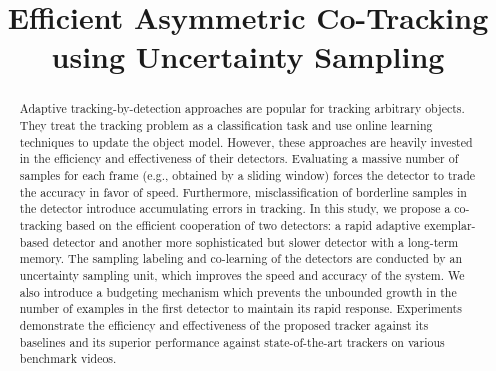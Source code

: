 \documentclass[conference,twoside]{IEEEtran}
\begin{document}
%
\title{Efficient Asymmetric Co-Tracking using Uncertainty Sampling}

\author{
}

\maketitle
\renewcommand{\headrulewidth}{0pt}
\renewcommand{\footrulewidth}{0pt}
\thispagestyle{fancy}
\cfoot{}

\begin{abstract}
Adaptive tracking-by-detection approaches are popular for tracking arbitrary objects. They treat the tracking problem as a classification task and use online learning techniques to update the object model. However, these approaches are heavily invested in the efficiency and effectiveness of their detectors. Evaluating a massive number of samples for each frame (e.g., obtained by a sliding window) forces the detector to trade the accuracy in favor of speed. Furthermore, misclassification of borderline samples in the detector introduce accumulating errors in tracking. In this study, we propose a co-tracking based on the efficient cooperation of two detectors: a rapid adaptive exemplar-based detector and another more sophisticated but slower detector with a long-term memory. The sampling labeling and co-learning of the detectors are conducted by an uncertainty sampling unit, which improves the speed and accuracy of the system. We also introduce a budgeting mechanism which prevents the unbounded growth in the number of examples in the first detector to maintain its rapid response. Experiments demonstrate the efficiency and effectiveness of the proposed tracker against its baselines and its superior performance against state-of-the-art trackers on various benchmark videos.
\end{abstract}
\end{document}
